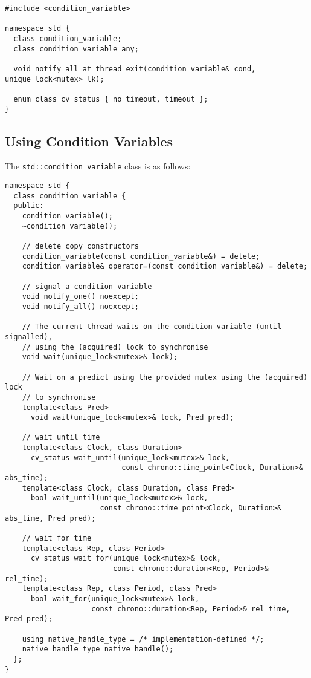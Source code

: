 \begin{verbatim}
#include <condition_variable>

namespace std {
  class condition_variable;
  class condition_variable_any;
  
  void notify_all_at_thread_exit(condition_variable& cond, unique_lock<mutex> lk);
  
  enum class cv_status { no_timeout, timeout };
}
\end{verbatim}

\subsection{Using Condition Variables}
The \texttt{std::condition_variable} class is as follows:
\begin{verbatim}
namespace std {
  class condition_variable {
  public:
    condition_variable();
    ~condition_variable();
  
    // delete copy constructors
    condition_variable(const condition_variable&) = delete;
    condition_variable& operator=(const condition_variable&) = delete;

    // signal a condition variable
    void notify_one() noexcept;
    void notify_all() noexcept;

    // The current thread waits on the condition variable (until signalled), 
    // using the (acquired) lock to synchronise
    void wait(unique_lock<mutex>& lock);

    // Wait on a predict using the provided mutex using the (acquired) lock 
    // to synchronise
    template<class Pred>
      void wait(unique_lock<mutex>& lock, Pred pred);
    
    // wait until time
    template<class Clock, class Duration>
      cv_status wait_until(unique_lock<mutex>& lock,
                           const chrono::time_point<Clock, Duration>& abs_time);
    template<class Clock, class Duration, class Pred>
      bool wait_until(unique_lock<mutex>& lock,
                      const chrono::time_point<Clock, Duration>& abs_time, Pred pred);
    
    // wait for time
    template<class Rep, class Period>
      cv_status wait_for(unique_lock<mutex>& lock,
                         const chrono::duration<Rep, Period>& rel_time);
    template<class Rep, class Period, class Pred>
      bool wait_for(unique_lock<mutex>& lock,
                    const chrono::duration<Rep, Period>& rel_time, Pred pred);
 
    using native_handle_type = /* implementation-defined */;
    native_handle_type native_handle();
  };
}
\end{verbatim}
